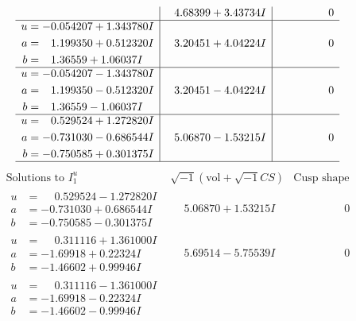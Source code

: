 \documentclass[1p]{elsarticle_modified}
\theoremstyle{definition}
\newcommand{\I}{\sqrt{-1}}
\begin{document}
$$\begin{array}{c|c|c}
 & \phantom{-}4.68399 + 3.43734 I & \phantom{-0.000000 } 0 \\ \hline\begin{aligned}
u &= -0.054207 + 1.343780 I \\
a &= \phantom{-}1.199350 + 0.512320 I \\
b &= \phantom{-}1.36559 + 1.06037 I\end{aligned}
 & \phantom{-}3.20451 + 4.04224 I & \phantom{-0.000000 } 0 \\ \hline\begin{aligned}
u &= -0.054207 - 1.343780 I \\
a &= \phantom{-}1.199350 - 0.512320 I \\
b &= \phantom{-}1.36559 - 1.06037 I\end{aligned}
 & \phantom{-}3.20451 - 4.04224 I & \phantom{-0.000000 } 0 \\ \hline\begin{aligned}
u &= \phantom{-}0.529524 + 1.272820 I \\
a &= -0.731030 - 0.686544 I \\
b &= -0.750585 + 0.301375 I\end{aligned}
 & \phantom{-}5.06870 - 1.53215 I & \phantom{-0.000000 } 0\\
 \hline 
 \end{array}$$\newpage$$\begin{array}{c|c|c}  
\text{Solutions to }I^u_{1}& \I (\text{vol} + \sqrt{-1}CS) & \text{Cusp shape}\\
 \hline 
\begin{aligned}
u &= \phantom{-}0.529524 - 1.272820 I \\
a &= -0.731030 + 0.686544 I \\
b &= -0.750585 - 0.301375 I\end{aligned}
 & \phantom{-}5.06870 + 1.53215 I & \phantom{-0.000000 } 0 \\ \hline\begin{aligned}
u &= \phantom{-}0.311116 + 1.361000 I \\
a &= -1.69918 + 0.22324 I \\
b &= -1.46602 + 0.99946 I\end{aligned}
 & \phantom{-}5.69514 - 5.75539 I & \phantom{-0.000000 } 0 \\ \hline\begin{aligned}
u &= \phantom{-}0.311116 - 1.361000 I \\
a &= -1.69918 - 0.22324 I \\
b &= -1.46602 - 0.99946 I\end{aligned}

\end{array}$$
\end{document}
